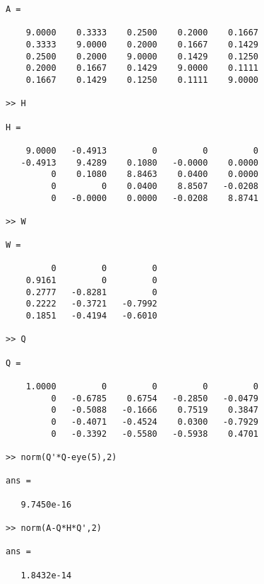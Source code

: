 \documentclass[12pt]{article}
\numberwithin{equation}{section}
\begin{document}
\begin{enumerate}
\begin{lstlisting}
A =

    9.0000    0.3333    0.2500    0.2000    0.1667
    0.3333    9.0000    0.2000    0.1667    0.1429
    0.2500    0.2000    9.0000    0.1429    0.1250
    0.2000    0.1667    0.1429    9.0000    0.1111
    0.1667    0.1429    0.1250    0.1111    9.0000

>> H

H =

    9.0000   -0.4913         0         0         0
   -0.4913    9.4289    0.1080   -0.0000    0.0000
         0    0.1080    8.8463    0.0400    0.0000
         0         0    0.0400    8.8507   -0.0208
         0   -0.0000    0.0000   -0.0208    8.8741

>> W

W =

         0         0         0
    0.9161         0         0
    0.2777   -0.8281         0
    0.2222   -0.3721   -0.7992
    0.1851   -0.4194   -0.6010

>> Q

Q =

    1.0000         0         0         0         0
         0   -0.6785    0.6754   -0.2850   -0.0479
         0   -0.5088   -0.1666    0.7519    0.3847
         0   -0.4071   -0.4524    0.0300   -0.7929
         0   -0.3392   -0.5580   -0.5938    0.4701

>> norm(Q'*Q-eye(5),2)

ans =

   9.7450e-16

>> norm(A-Q*H*Q',2)

ans =

   1.8432e-14
\end{lstlisting}
 \end{enumerate}
 
\end{document}
